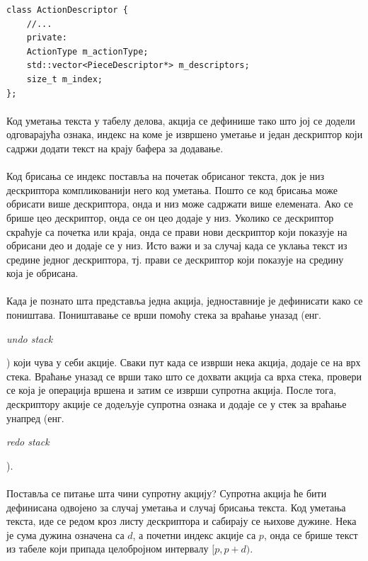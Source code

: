 \documentclass[12pt,oneside]{memoir}
\begin{document}
\begin{verbatim}
class ActionDescriptor {
	//...
	private:
	ActionType m_actionType;
	std::vector<PieceDescriptor*> m_descriptors;
	size_t m_index;
};
\end{verbatim}


\paragraph{}
Код уметања текста у табелу делова, акција се дефинише тако што јој
се додели одговарајућа ознака, индекс на коме је извршено уметање и
један дескриптор који садржи додати текст на крају бафера за додавање.

\paragraph{}
Код брисања се индекс поставља на почетак обрисаног текста, док је низ
дескриптора компликованији него код уметања. Пошто се код брисања може
обрисати више дескриптора, онда и низ може садржати више елемената. Ако
се брише цео дескриптор, онда се он цео додаје у низ. Уколико се дескриптор
скраћује са почетка или краја, онда се прави нови дескриптор који показује
на обрисани део и додаје се у низ. Исто важи и за случај када се уклања
текст из средине једног дескриптора, тј. прави се дескриптор који показује
на средину која је обрисана.

\paragraph{}
Када је познато шта представља једна акција, једноставније је дефинисати како 
се поништава. Поништавање се врши помоћу стека за враћање уназад 
(енг. \begin{latinica}\textit{undo stack}\end{latinica}) који чува у себи
акције. Сваки пут када се изврши нека акција, додаје се на врх стека. Враћање
уназад се врши тако што се дохвати акција са врха стека, провери се која је 
операција вршена и затим се изврши супротна акција. После тога, дескриптору
акције се додељује супротна ознака и додаје се у стек за враћање унапред
(енг. \begin{latinica}\textit{redo stack}\end{latinica}).

\paragraph{}
Поставља се питање шта чини супротну акцију? Супротна акција ће бити дефинисана
одвојено за случај уметања и случај брисања текста. Код уметања текста, иде се
редом кроз листу дескриптора и сабирају се њихове дужине. Нека је сума
дужина означена са \(d\), а почетни индекс акције са \(p\), онда се брише
текст из табеле који припада целобројном интервалу \([p, p+d)\).
\end{document}
